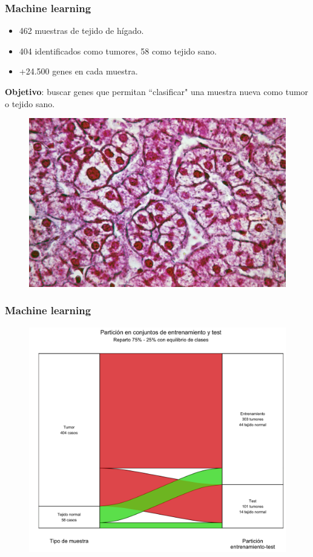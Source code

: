 \documentclass{beamer}
\begin{document}

\begin{frame}\frametitle{Machine learning}
	
	\begin{itemize}
		\item 462 muestras de tejido de hígado.
		\item 404 identificados como tumores, 58 como tejido sano.
		\item +24.500 genes en cada muestra.
	\end{itemize}
	\textbf{Objetivo}: buscar genes que permitan ``clasificar" una muestra nueva como tumor o tejido sano.
	\begin{figure}
		\centering
		\includegraphics[width=.65\textwidth]{images/liver.jpg}
	\end{figure}
	
\end{frame}


\begin{frame}\frametitle{Machine learning}
	
	\begin{figure}
		\centering
		\includegraphics[width=.75\textwidth]{images/07_higado_biclase_sankey.png}
	\end{figure}

\end{frame}
\end{document}

